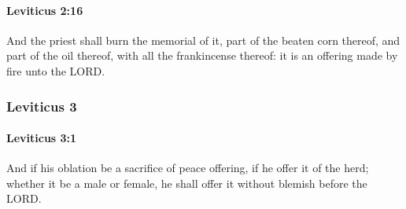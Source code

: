 		\paragraph{Leviticus 2:16} %
			\label{LEVITICUS-2-16}

			And the priest shall burn the memorial of it, part of the beaten corn thereof, and part of the oil thereof, with all the frankincense thereof: it is an offering made by fire unto the LORD.

	\subsubsection{Leviticus 3} %
		\label{LEVITICUS-3}

		\paragraph{Leviticus 3:1} %
			\label{LEVITICUS-3-1}

			And if his oblation be a sacrifice of peace offering, if he offer it of the herd; whether it be a male or female, he shall offer it without blemish before the LORD.

